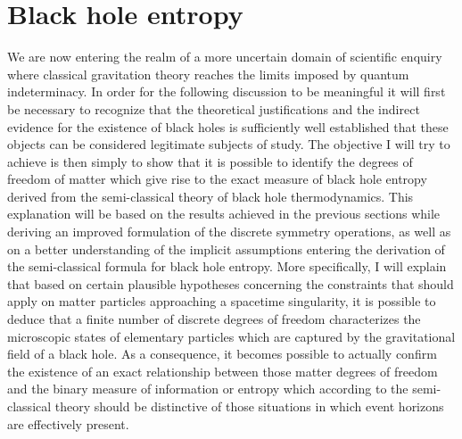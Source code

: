\documentclass[notitlepage,12pt]{report}
\begin{document}
\section{Black hole entropy}

We are now entering the realm of a more uncertain domain of scientific enquiry where classical gravitation theory reaches the limits imposed by quantum indeterminacy. In order for the following discussion to be meaningful it will first be necessary to recognize that the theoretical justifications and the indirect evidence for the existence of black holes is sufficiently well established that these objects can be considered legitimate subjects of study. The objective I will try to achieve is then simply to show that it is possible to identify the degrees of freedom of matter which give rise to the exact measure of black hole entropy derived from the semi-classical theory of black hole thermodynamics. This explanation will be based on the results achieved in the previous sections while deriving an improved formulation of the discrete symmetry operations, as well as on a better understanding of the implicit assumptions entering the derivation of the semi-classical formula for black hole entropy. More specifically, I will explain that based on certain plausible hypotheses concerning the constraints that should apply on matter particles approaching a spacetime singularity, it is possible to deduce that a finite number of discrete degrees of freedom characterizes the microscopic states of elementary particles which are captured by the gravitational field of a black hole. As a consequence, it becomes possible to actually confirm the existence of an exact relationship between those matter degrees of freedom and the binary measure of information or entropy which according to the semi-classical theory should be distinctive of those situations in which event horizons are effectively present.
\end{document}
